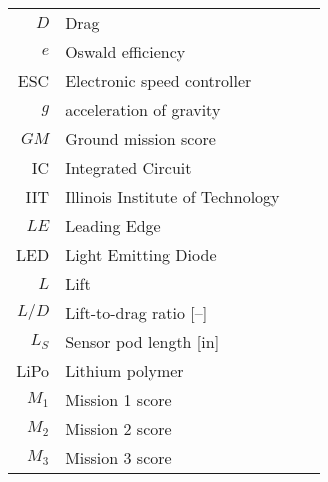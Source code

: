 \begin{tabular}{rl!{\hspace{1em}}rl}
    $D$ & Drag\\
    $e$ & Oswald efficiency\\
    ESC & Electronic speed controller\\
    $g$ & acceleration of gravity\\
    $GM$ & Ground mission score\\
    IC & Integrated Circuit \\
    IIT & Illinois Institute of Technology\\
    $LE$ & Leading Edge\\
    LED & Light Emitting Diode\\
    $L$ & Lift\\
    $L/D$ & Lift-to-drag ratio [--]\\
    $L_S$ & Sensor pod length [in]\\
    LiPo & Lithium polymer\\
    $M_1$ & Mission 1 score\\
    $M_2$ & Mission 2 score\\
    $M_3$ & Mission 3 score\\
    
    
\end{tabular}